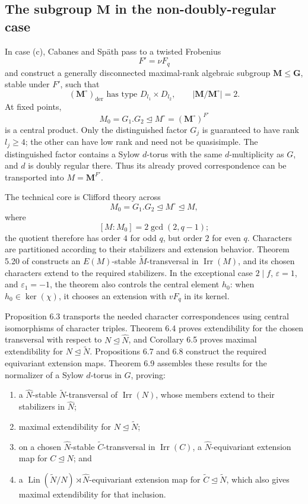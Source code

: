 \documentclass[11pt]{article}
\newcommand{\Irr}{\operatorname{Irr}}
\newcommand{\G}{\mathbf{G}}
\newcommand{\M}{\mathbf{M}}
\begin{document}
\subsection{\texorpdfstring{The subgroup \(\M\) in the non-doubly-regular case}
  {The subgroup M in the non-doubly-regular case}}

In case (c), Cabanes and Sp{\"a}th pass to a twisted Frobenius
\[
  F'=\nu F_q
\]
and construct a generally disconnected maximal-rank algebraic subgroup
\(\M\leq\G\), stable under \(F'\), such that
\[
  (\M^\circ)_{\mathrm{der}}
  \text{ has type }
  D_{l_1}\times D_{l_2},
  \qquad
  |\M/\M^\circ|=2.
\]
At fixed points,
\[
  M_0=G_1.G_2\trianglelefteq
  M^\circ=(\M^\circ)^{F'}
\]
is a central product.  Only the distinguished factor \(G_j\) is
guaranteed to have rank \(l_j\geq4\); the other can have low rank and
need not be quasisimple.  The distinguished factor contains a Sylow
\(d\)-torus with the same \(d\)-multiplicity as \(G\), and \(d\) is
doubly regular there.  Thus its already proved correspondence can be
transported into \(M=\M^{F'}\).

The technical core is Clifford theory across
\[
  M_0=G_1.G_2
   \trianglelefteq M^\circ
   \trianglelefteq M,
\]
where
\[
  [M:M_0]=2\gcd(2,q-1);
\]
the quotient therefore has order \(4\) for odd \(q\), but order \(2\)
for even \(q\).  Characters are partitioned according to their
stabilizers and extension behavior.  Theorem 5.20 of
\cite{CabanesSpath2026} constructs an \(E(M)\)-stable
\(\widetilde M\)-transversal in \(\Irr(M)\), and its chosen characters
extend to the required stabilizers.  In the exceptional case
\(2\mid f\), \(\varepsilon=1\), and \(\varepsilon_1=-1\), the theorem
also controls the central element \(h_0\): when \(h_0\in\ker(\chi)\), it
chooses an extension with \(vF_q\) in its kernel.

Proposition 6.3 transports the needed character correspondences using
central isomorphisms of character triples.  Theorem 6.4 proves
extendibility for the chosen transversal with respect to
\(N\trianglelefteq\widehat N\), and Corollary 6.5 proves maximal
extendibility for \(N\trianglelefteq\widetilde N\).  Propositions 6.7
and 6.8 construct the required equivariant extension maps.  Theorem 6.9
assembles these results for the normalizer of a Sylow \(d\)-torus in
\(G\), proving:

\begin{enumerate}
  \item a \(\widehat N\)-stable \(\widetilde N\)-transversal of
  \(\Irr(N)\), whose members extend to their stabilizers in
  \(\widehat N\);
  \item maximal extendibility for \(N\trianglelefteq\widetilde N\);
  \item on a chosen \(\widehat N\)-stable
  \(\widetilde C\)-transversal in \(\Irr(C)\), a
  \(\widehat N\)-equivariant extension map for
  \(C\trianglelefteq N\); and
  \item a
  \(\operatorname{Lin}(\widetilde N/N)\rtimes\widehat N\)-equivariant
  extension map for
  \(\widetilde C\trianglelefteq\widetilde N\), which also gives maximal
  extendibility for that inclusion.
\end{enumerate}
\end{document}
